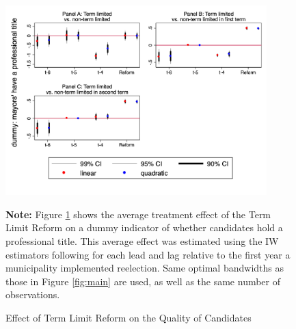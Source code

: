 \documentclass[12pt]{amsart}
\numberwithin{equation}{section}
\theoremstyle{definition}
\theoremstyle{definition}
\theoremstyle{definition}
\begin{document}
 \begin{figure}[h]   
\centering
 \caption{Effect of Term Limit Reform on the Quality of Candidates}
 \label{fig:quality_trend}
\includegraphics[width=0.9\textwidth]{Figures_incumbency/quality_parallel.png}
       \captionsetup{justification=centering}
         
 \textbf{Note:} Figure \ref{fig:quality_trend} shows the average treatment effect of the Term Limit Reform on a dummy indicator of whether candidates hold a professional title. This average effect was estimated using the IW estimators following \citet{abraham_sun_2020} for each lead and lag relative to the first year a municipality implemented reelection. Same optimal bandwidths as those in Figure \ref{fig:main} are used, as well as the same number of observations.   
     
\end{figure}   
\end{document}
